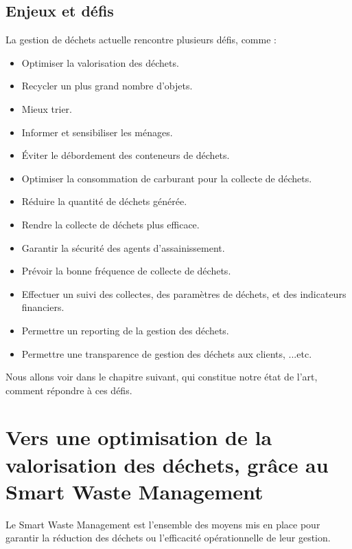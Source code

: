 \documentclass[a4paper,12pt]{report}
\begin{document}


\section{Enjeux et défis}
La gestion de déchets actuelle rencontre plusieurs défis, comme :
\begin{itemize}
\item Optimiser la valorisation des déchets.
\item Recycler un plus grand nombre d'objets.
\item Mieux trier.
\item Informer et sensibiliser les ménages.
\item Éviter le débordement des conteneurs de déchets.
\item Optimiser la consommation de carburant pour la collecte de déchets.
\item Réduire la quantité de déchets générée.
\item Rendre la collecte de déchets plus efficace.
\item Garantir la sécurité des agents d'assainissement.
\item Prévoir la bonne fréquence de collecte de déchets.
\item Effectuer un suivi des collectes, des paramètres de déchets, et des indicateurs financiers.
\item Permettre un reporting de la gestion des déchets.
\item Permettre une transparence de gestion des déchets aux clients, ...etc.
\end{itemize}
Nous allons voir dans le chapitre suivant, qui constitue notre état de l'art, comment répondre à ces défis.

\chapter{Vers une optimisation de la valorisation des déchets, grâce au Smart Waste Management}

Le Smart Waste Management est l’ensemble des moyens mis en place pour garantir la réduction des déchets ou l’efficacité opérationnelle de leur gestion. \cite{ref2}
\end{document}
